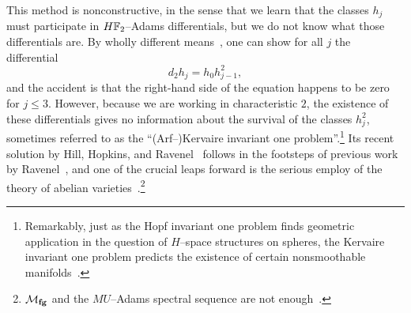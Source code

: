 \begin{remark}
This method is nonconstructive, in the sense that we learn that the classes \(h_j\) must participate in \(\HFtwo\)--Adams differentials, but we do not know what those differentials are.  By wholly different means~\cite[Corollary VI.1.5]{BMMS}, one can show for all \(j\) the differential \[d_2 h_j = h_0 h_{j-1}^2,\] and the accident is that the right-hand side of the equation happens to be zero for \(j \le 3\).  However, because we are working in characteristic \(2\), the existence of these differentials gives no information about the survival of the classes \(h_j^2\), sometimes referred to as the ``(Arf--)Kervaire invariant one problem''.\footnote{Remarkably, just as the Hopf invariant one problem finds geometric application in the question of \(H\)--space structures on spheres, the Kervaire invariant one problem predicts the existence of certain nonsmoothable manifolds~\cite{Browder}.}  Its recent solution by Hill, Hopkins, and Ravenel~\cite{HHR} follows in the footsteps of previous work by Ravenel~\cite{RavenelNonexistenceArfInvariantElts}, and one of the crucial leaps forward is the serious employ of the theory of abelian varieties~\cite{MoravaAbVarsAndKervaire}.\footnote{\(\mathcal{M}_{\mathbf{fg}}\) and the \(MU\)--Adams spectral sequence are not enough~\cite[Section 8.F]{MRW}.}
\end{remark}










